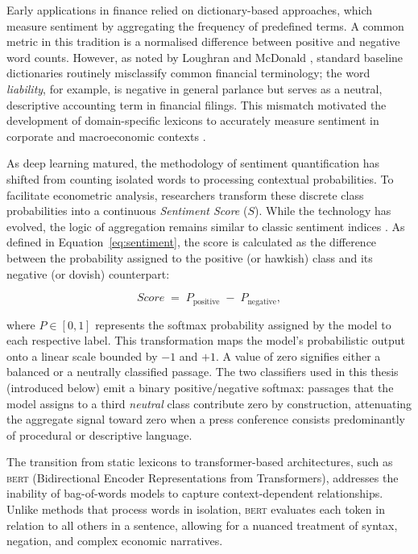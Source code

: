 Early applications in finance relied on dictionary-based approaches, which measure sentiment by aggregating the frequency of predefined terms. A common metric in this tradition is a normalised difference between positive and negative word counts. However, as noted by Loughran and McDonald \cite{LoughranMcDonald2011}, standard baseline dictionaries routinely misclassify common financial terminology; the word \textit{liability}, for example, is negative in general parlance but serves as a neutral, descriptive accounting term in financial filings. This mismatch motivated the development of domain-specific lexicons to accurately measure sentiment in corporate and macroeconomic contexts \cite{LoughranMcDonald2011}.

As deep learning matured, the methodology of sentiment quantification has shifted from counting isolated words to processing contextual probabilities. To facilitate econometric analysis, researchers transform these discrete class probabilities into a continuous \textit{Sentiment Score} ($S$). While the technology has evolved, the logic of aggregation remains similar to classic sentiment indices \cite{gentzkow2019text}. As defined in Equation~\ref{eq:sentiment}, the score is calculated as the difference between the probability assigned to the positive (or hawkish) class and its negative (or dovish) counterpart:

\begin{equation}
    \label{eq:sentiment}
    Score \;=\; P_{\text{positive}} \;-\; P_{\text{negative}},
\end{equation}

where $P \in [0, 1]$ represents the softmax probability assigned by the model to each respective label. This transformation maps the model's probabilistic output onto a linear scale bounded by $-1$ and $+1$. A value of zero signifies either a balanced or a neutrally classified passage. The two classifiers used in this thesis (introduced below) emit a binary positive/negative softmax: passages that the model assigns to a third \textit{neutral} class contribute zero by construction, attenuating the aggregate signal toward zero when a press conference consists predominantly of procedural or descriptive language.

The transition from static lexicons to transformer-based architectures, such as \textsc{bert} (Bidirectional Encoder Representations from Transformers), addresses the inability of bag-of-words models to capture context-dependent relationships. Unlike methods that process words in isolation, \textsc{bert} evaluates each token in relation to all others in a sentence, allowing for a nuanced treatment of syntax, negation, and complex economic narratives.

